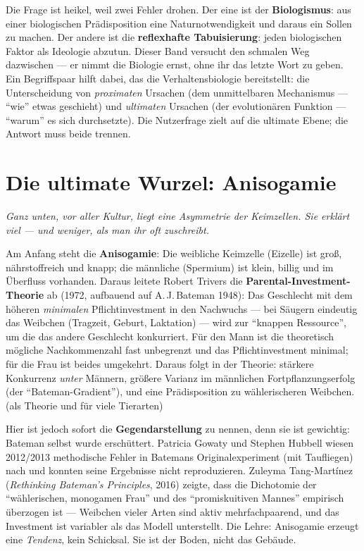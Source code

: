 \documentclass[11pt,a4paper,ngerman]{scrartcl}
\newcommand{\chipbase}[2]{\hspace{0pt}{\footnotesize\textcolor{#1}{[\textsc{#2}]}}}
\newcommand{\chipbelegt}[1]{\chipbase{chipgreen}{#1}}
\newcommand{\chipumstritten}[1]{\chipbase{chipred}{#1}}
\begin{document}
Die Frage ist heikel, weil zwei Fehler drohen. Der eine ist der \textbf{Biologismus}: aus einer biologischen Prädisposition eine Naturnotwendigkeit und daraus ein Sollen zu machen. Der andere ist die \textbf{reflexhafte Tabuisierung}: jeden biologischen Faktor als Ideologie abzutun. Dieser Band versucht den schmalen Weg dazwischen --- er nimmt die Biologie ernst, ohne ihr das letzte Wort zu geben. Ein Begriffspaar hilft dabei, das die Verhaltensbiologie bereitstellt: die Unterscheidung von \emph{proximaten} Ursachen (dem unmittelbaren Mechanismus --- \enquote{wie} etwas geschieht) und \emph{ultimaten} Ursachen (der evolutionären Funktion --- \enquote{warum} es sich durchsetzte). \chipbelegt{belegt} Die Nutzerfrage zielt auf die ultimate Ebene; die Antwort muss beide trennen.

\section{Die ultimate Wurzel: Anisogamie}
\noindent\textit{Ganz unten, vor aller Kultur, liegt eine Asymmetrie der Keimzellen. Sie erklärt viel --- und weniger, als man ihr oft zuschreibt.}
\medskip

Am Anfang steht die \textbf{Anisogamie}: Die weibliche Keimzelle (Eizelle) ist groß, nährstoffreich und knapp; die männliche (Spermium) ist klein, billig und im Überfluss vorhanden. Daraus leitete Robert Trivers die \textbf{Parental-Investment-Theorie} ab (1972, aufbauend auf A.\,J.\,Bateman 1948): Das Geschlecht mit dem höheren \emph{minimalen} Pflichtinvestment in den Nachwuchs --- bei Säugern eindeutig das Weibchen (Tragzeit, Geburt, Laktation) --- wird zur \enquote{knappen Ressource}, um die das andere Geschlecht konkurriert. Für den Mann ist die theoretisch mögliche Nachkommenzahl fast unbegrenzt und das Pflichtinvestment minimal; für die Frau ist beides umgekehrt. Daraus folgt in der Theorie: stärkere Konkurrenz \emph{unter} Männern, größere Varianz im männlichen Fortpflanzungserfolg (der \enquote{Bateman-Gradient}), und eine Prädisposition zu wählerischeren Weibchen. \chipbelegt{belegt} (als Theorie und für viele Tierarten)

Hier ist jedoch sofort die \textbf{Gegendarstellung} zu nennen, denn sie ist gewichtig: Bateman selbst wurde erschüttert. Patricia Gowaty und Stephen Hubbell wiesen 2012/2013 methodische Fehler in Batemans Originalexperiment (mit Taufliegen) nach und konnten seine Ergebnisse nicht reproduzieren. Zuleyma Tang-Martínez (\emph{Rethinking Bateman's Principles}, 2016) zeigte, dass die Dichotomie der \enquote{wählerischen, monogamen Frau} und des \enquote{promiskuitiven Mannes} empirisch überzogen ist --- Weibchen vieler Arten sind aktiv mehrfachpaarend, und das Investment ist variabler als das Modell unterstellt. \chipumstritten{umstritten} Die Lehre: Anisogamie erzeugt eine \emph{Tendenz}, kein Schicksal. Sie ist der Boden, nicht das Gebäude.
\end{document}
